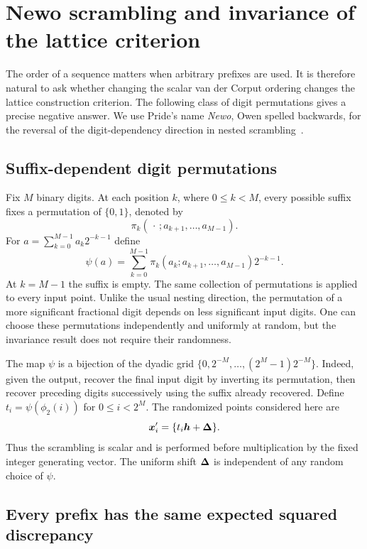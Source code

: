 \section{Newo scrambling and invariance of the lattice criterion}
\label{sec:newo}

The order of a sequence matters when arbitrary prefixes are used. It is
therefore natural to ask whether changing the scalar van der Corput ordering
changes the lattice construction criterion. The following class of digit
permutations gives a precise negative answer. We use Pride's name
\emph{Newo}, Owen spelled backwards, for the reversal of the digit-dependency
direction in nested scrambling~\cite{pride-notes}.

\subsection{Suffix-dependent digit permutations}

Fix $M$ binary digits. At each position $k$, where $0\le k<M$, every
possible suffix fixes a permutation of $\{0,1\}$, denoted by
\[
 \pi_k(\,\cdot\,;a_{k+1},\ldots,a_{M-1}).
\]
For $a=\sum_{k=0}^{M-1}a_k2^{-k-1}$ define
\begin{equation}\label{eq:newo-definition}
 \psi(a)=\sum_{k=0}^{M-1}
 \pi_k(a_k;a_{k+1},\ldots,a_{M-1})2^{-k-1}.
\end{equation}
At $k=M-1$ the suffix is empty. The same collection of permutations is
applied to every input point. Unlike the usual nesting direction, the
permutation of a more significant fractional digit depends on less
significant input digits. One can choose these permutations independently
and uniformly at random, but the invariance result does not require their
randomness.

The map $\psi$ is a bijection of the dyadic grid
$\{0,2^{-M},\ldots,(2^M-1)2^{-M}\}$.
Indeed, given the output, recover the final input digit by inverting its
permutation, then recover preceding digits successively using the suffix
already recovered. Define $t_i=\psi(\phi_2(i))$ for $0\le i<2^M$.
The randomized points considered here are
\begin{equation}\label{eq:newo-points}
 \boldsymbol{x}_i'=\{t_i\boldsymbol{h}+\boldsymbol{\Delta}\}.
\end{equation}
Thus the scrambling is scalar and is performed before multiplication by the
fixed integer generating vector. The uniform shift $\boldsymbol{\Delta}$ is independent
of any random choice of $\psi$.

\subsection{Every prefix has the same expected squared discrepancy}

